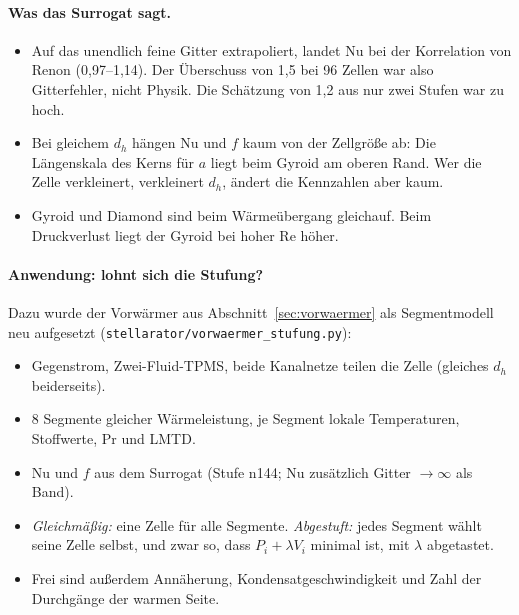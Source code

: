 \paragraph{Was das Surrogat sagt.}
\begin{itemize}
\item Auf das unendlich feine Gitter extrapoliert, landet Nu bei der Korrelation von Renon (0,97--1,14). Der
  Überschuss von 1,5 bei 96 Zellen war also Gitterfehler, nicht Physik. Die Schätzung von 1,2 aus nur zwei Stufen war
  zu hoch.
\item Bei gleichem $d_h$ hängen Nu und $f$ kaum von der Zellgröße ab: Die Längenskala des Kerns für $a$ liegt beim
  Gyroid am oberen Rand. Wer die Zelle verkleinert, verkleinert $d_h$, ändert die Kennzahlen aber kaum.
\item Gyroid und Diamond sind beim Wärmeübergang gleichauf. Beim Druckverlust liegt der Gyroid bei hoher Re höher.
\end{itemize}

\paragraph{Anwendung: lohnt sich die Stufung?} Dazu wurde der Vorwärmer aus Abschnitt~\ref{sec:vorwaermer}
als Segmentmodell neu aufgesetzt (\texttt{stellarator/vorwaermer\_stufung.py}):
\begin{itemize}
\item Gegenstrom, Zwei-Fluid-TPMS, beide Kanalnetze teilen die Zelle (gleiches $d_h$ beiderseits).
\item 8 Segmente gleicher Wärmeleistung, je Segment lokale Temperaturen, Stoffwerte, Pr und LMTD.
\item Nu und $f$ aus dem Surrogat (Stufe n144; Nu zusätzlich Gitter $\to\infty$ als Band).
\item \emph{Gleichmäßig:} eine Zelle für alle Segmente. \emph{Abgestuft:} jedes Segment wählt seine Zelle selbst, und
  zwar so, dass $P_i + \lambda V_i$ minimal ist, mit $\lambda$ abgetastet.
\item Frei sind außerdem Annäherung, Kondensatgeschwindigkeit und Zahl der Durchgänge der warmen Seite.
\end{itemize}



